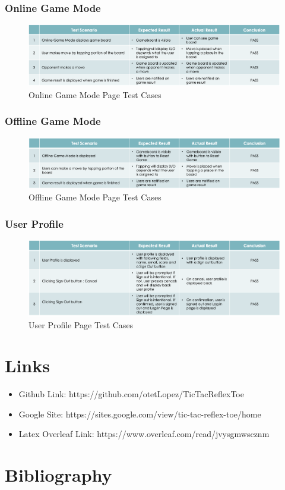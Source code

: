 \documentclass{article}
\begin{document}
    \subsubsection{Online Game Mode}
        \begin{figure}[h]
            \centering
            \includegraphics[width=5.5in]{images/test_5_online.png}
        \caption{Online Game Mode Page Test Cases}
        \end{figure}
    \subsubsection{Offline Game Mode}
        \begin{figure}[h]
            \centering
            \includegraphics[width=5.5in]{images/test_6_offline.png}
        \caption{Offline Game Mode Page Test Cases}
        \end{figure}
    \subsubsection{User Profile}
        \begin{figure}[h]
            \centering
            \includegraphics[width=5.5in]{images/test_7_profile.png}
        \caption{User Profile Page Test Cases}
        \end{figure}
    \newpage
\section{Links}
\begin{itemize}
    \item Github Link:  https://github.com/otetLopez/TicTacReflexToe
    \item Google Site: 
    https://sites.google.com/view/tic-tac-reflex-toe/home
    \item Latex Overleaf Link: 
    https://www.overleaf.com/read/jvysgmwscznm
\end{itemize}
\newpage
\section{Bibliography}
\end{document}
